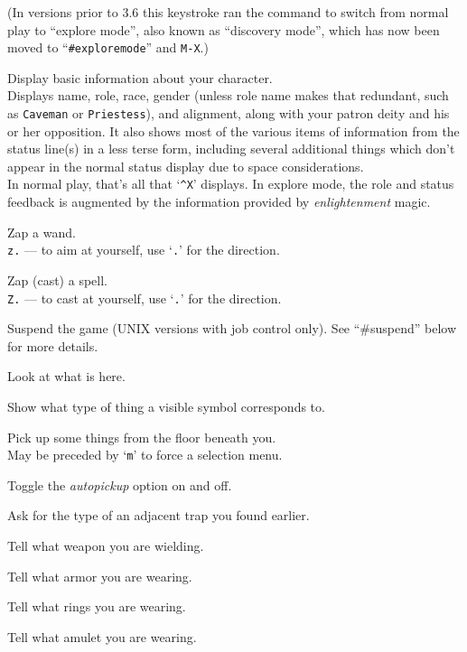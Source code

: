 (In versions prior to 3.6 this keystroke ran the command to switch from normal
play to ``explore mode'', also known as ``discovery mode'', which has now
been moved to ``{\tt \#exploremode}'' and {\tt M-X}.)
\item[\tb{\^{}X}]
Display basic information about your character.\\
Displays name, role, race, gender (unless role name makes that
redundant, such as {\tt Caveman} or {\tt Priestess}), and alignment,
along with your patron deity and his or her opposition.  It also
shows most of the various items of information from the status line(s)
in a less terse form, including several additional things which don't
appear in the normal status display due to space considerations.\\
In normal play, that's all that `{\tt \^{}X}' displays.
In explore mode, the role and status feedback is augmented by the
information provided by {\it enlightenment\/} magic.
\item[\tb{z}]
Zap a wand.\\
{\tt z.} --- to aim at yourself, use `{\tt .}' for the direction.
\item[\tb{Z}]
Zap (cast) a spell.\\
{\tt Z.} --- to cast at yourself, use `{\tt .}' for the direction.
\item[\tb{\^{}Z}]
Suspend the game (UNIX versions with job control only).
See ``\#suspend'' below for more details.
\item[\tb{:}]
Look at what is here.
\item[\tb{;}]
Show what type of thing a visible symbol corresponds to.
\item[\tb{,}]
Pick up some things from the floor beneath you.\\
May be preceded by `{\tt m}' to force a selection menu.
\item[\tb{@}]
Toggle the {\it autopickup\/} option on and off.
\item[\tb{\^{}}]
Ask for the type of an adjacent trap you found earlier.
\item[\tb{)}]
Tell what weapon you are wielding.
\item[\tb{[}]
Tell what armor you are wearing.
\item[\tb{=}]
Tell what rings you are wearing.
\item[\tb{"}]
Tell what amulet you are wearing.
\item[\tb{(}]
